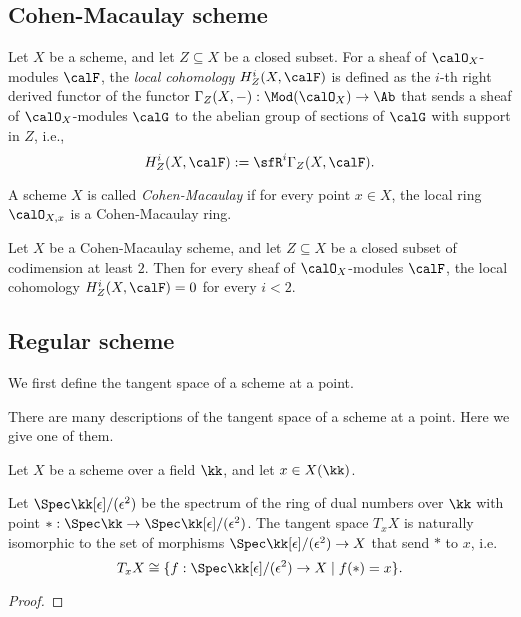 \subsection{Cohen-Macaulay scheme}

    \begin{definition}\label{def:local_cohomology}
        Let \(X\) be a scheme, and let \(Z\subseteq X\) be a closed subset.
        For a sheaf of \(\calO_X\)-modules \(\calF\), the \emph{local cohomology} \(H_Z^i(X,\calF)\) is defined as the \(i\)-th right derived functor of the functor \(\Gamma_Z(X,-):\Mod(\calO_X)\to \Ab\) that sends a sheaf of \(\calO_X\)-modules \(\calG\) to the abelian group of sections of \(\calG\) with support in \(Z\), i.e.,
        \[
            H_Z^i(X,\calF) := \sfR^i \Gamma_Z(X,\calF).
        \]
    \end{definition}

    \begin{definition}\label{def:Cohen-Macaulay_scheme}
        A scheme \(X\) is called \emph{Cohen-Macaulay} if for every point \(x \in X\), the local ring \(\calO_{X,x}\) is a Cohen-Macaulay ring.
    \end{definition}

    \begin{theorem}\label{thm:Cohen-Macaulay_scheme_and_vanishing_of_local_cohomology}
        Let \(X\) be a Cohen-Macaulay scheme, and let \(Z\subseteq X\) be a closed subset of codimension at least \(2\).
        Then for every sheaf of \(\calO_X\)-modules \(\calF\), the local cohomology \(H_Z^i(X,\calF) = 0\) for every \(i < 2\).
    \end{theorem}

\subsection{Regular scheme}

    We first define the tangent space of a scheme at a point.

    There are many descriptions of the tangent space of a scheme at a point. 
    Here we give one of them.

    Let $X$ be a scheme over a field $\kk$, and let $x \in X(\kk)$.

    \begin{proposition}\label{prop:tangent_space_as_image_of_ring_of_dual_numbers}
        Let \(\Spec \kk[\epsilon]/(\epsilon^2)\) be the spectrum of the ring of dual numbers over \(\kk\) with point \(*:\Spec \kk \to \Spec \kk[\epsilon]/(\epsilon^2)\).
        The tangent space $T_x X$ is naturally isomorphic to the set of morphisms $\Spec \kk[\epsilon]/(\epsilon^2) \to X$ that send \(*\) to $x$, i.e.
        \[ T_x X \cong \{ f: \Spec \kk[\epsilon]/(\epsilon^2) \to X \mid f(*) = x \}. \]
    \end{proposition}
    \begin{proof}
    \end{proof}